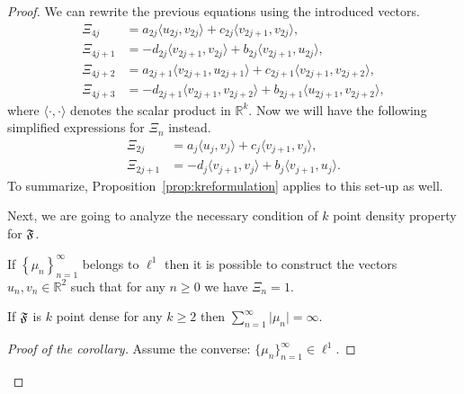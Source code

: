 \begin{proof}
      We can rewrite the previous equations using the introduced vectors.
      \begin{align*}
        \Xi_{4j} &= a_{2j} \langle u_{2j}, v_{2j}\rangle + c_{2j} \langle v_{2j+1}, v_{2j}\rangle,\\
        \Xi_{4j + 1} &= -d_{2j} \langle v_{2j+1}, v_{2j}\rangle + b_{2j} \langle v_{2j+1}, u_{2j}\rangle,\\
        \Xi_{4j + 2} &= a_{2j+1} \langle v_{2j+1}, u_{2j+1} \rangle + c_{2j+1} \langle v_{2j+1}, v_{2j+2} \rangle,\\
        \Xi_{4j + 3} &= -d_{2j+1} \langle v_{2j+1}, v_{2j+2}\rangle + b_{2j+1} \langle u_{2j+1}, v_{2j+2} \rangle,
      \end{align*}
        where $\langle\cdot, \cdot\rangle$ denotes the scalar product in $\mathbb{R}^k$.
      Now we will have the following simplified expressions for $\Xi_n$ instead.
      \begin{align*}
        \Xi_{2j} &= a_{j} \langle u_{j}, v_{j} \rangle  + c_{j} \langle v_{j+1}, v_{j} \rangle,\\
        \Xi_{2j + 1} &= -d_{j} \langle v_{j+1}, v_{j} \rangle + b_{j} \langle v_{j+1}, u_{j}\rangle.
      \end{align*}
      To summarize, Proposition~\ref{prop:kreformulation} applies to this set-up as well.

      Next, we are going to analyze the necessary condition of $k$ point density property for $\mathfrak{F}$.
      \begin{prop}
        \label{prop:2pd}
        If $\left\{\mu_n\right\}_{n=1}^\infty$ belongs to $\ell^1$ then it is possible to construct
          the vectors $u_n, v_n \in \mathbb{R}^2$ such that for any $n \geq 0$ we have $\Xi_n = 1$.
      \end{prop}
      \begin{corol}
        \label{corol:2density}
        If $\mathfrak{F}$ is $k$ point dense for any $k \geq 2$ then $\sum_{n=1}^\infty \lvert\mu_n\rvert = \infty$.
      \end{corol}
      \begin{proof}[Proof of the corollary]
        Assume the converse: $\{\mu_n\}_{n=1}^\infty \in \ell^1$.


\end{proof}
\end{proof}
